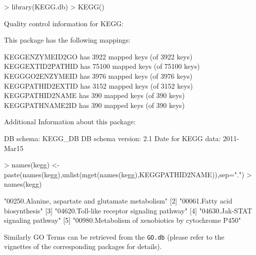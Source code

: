 \documentclass[11pt]{article}
\newcommand{\Rpackage}[1]{{\texttt{#1}}}
\begin{document}
\begin{Schunk}
\begin{Sinput}
> library(KEGG.db)
> KEGG()
\end{Sinput}
\begin{Soutput}
Quality control information for KEGG:


This package has the following mappings:

KEGGENZYMEID2GO has 3922 mapped keys (of 3922 keys)
KEGGEXTID2PATHID has 75100 mapped keys (of 75100 keys)
KEGGGO2ENZYMEID has 3976 mapped keys (of 3976 keys)
KEGGPATHID2EXTID has 3152 mapped keys (of 3152 keys)
KEGGPATHID2NAME has 390 mapped keys (of 390 keys)
KEGGPATHNAME2ID has 390 mapped keys (of 390 keys)


Additional Information about this package:

DB schema: KEGG_DB
DB schema version: 2.1
Date for KEGG data: 2011-Mar15
\end{Soutput}
\begin{Sinput}
> names(kegg) <- paste(names(kegg),unlist(mget(names(kegg),KEGGPATHID2NAME)),sep=".")
> names(kegg)
\end{Sinput}
\begin{Soutput}
[1] "00250.Alanine, aspartate and glutamate metabolism" 
[2] "00061.Fatty acid biosynthesis"                     
[3] "04620.Toll-like receptor signaling pathway"        
[4] "04630.Jak-STAT signaling pathway"                  
[5] "00980.Metabolism of xenobiotics by cytochrome P450"
\end{Soutput}
\end{Schunk}

Similarly GO Terms can be retrieved from the \Rpackage{GO.db}
(please refer to the vignettes of the corresponding packages for details).
\end{document}
